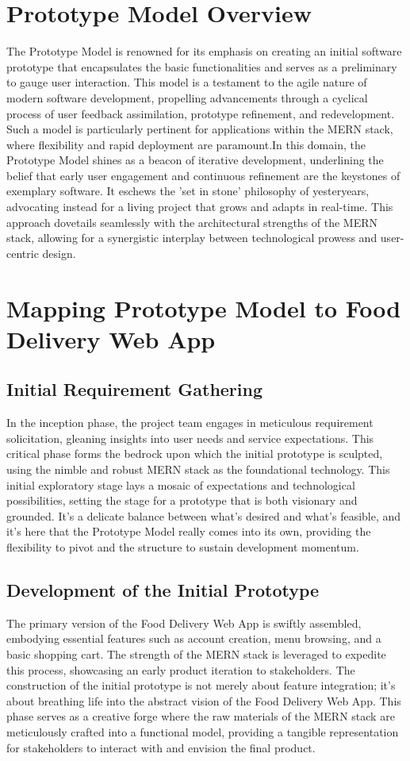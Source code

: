 \documentclass{article}
\begin{document}
\section{Prototype Model Overview}
The Prototype Model is renowned for its emphasis on creating an initial software prototype that encapsulates the basic functionalities and serves as a preliminary to gauge user interaction. This model is a testament to the agile nature of modern software development, propelling advancements through a cyclical process of user feedback assimilation, prototype refinement, and redevelopment. Such a model is particularly pertinent for applications within the MERN stack, where flexibility and rapid deployment are paramount.In this domain, the Prototype Model shines as a beacon of iterative development, underlining the belief that early user engagement and continuous refinement are the keystones of exemplary software. It eschews the 'set in stone' philosophy of yesteryears, advocating instead for a living project that grows and adapts in real-time. This approach dovetails seamlessly with the architectural strengths of the MERN stack, allowing for a synergistic interplay between technological prowess and user-centric design.

\section{Mapping Prototype Model to Food Delivery Web App}
\subsection{Initial Requirement Gathering}
In the inception phase, the project team engages in meticulous requirement solicitation, gleaning insights into user needs and service expectations. This critical phase forms the bedrock upon which the initial prototype is sculpted, using the nimble and robust MERN stack as the foundational technology. This initial exploratory stage lays a mosaic of expectations and technological possibilities, setting the stage for a prototype that is both visionary and grounded. It's a delicate balance between what's desired and what's feasible, and it's here that the Prototype Model really comes into its own, providing the flexibility to pivot and the structure to sustain development momentum.

\subsection{Development of the Initial Prototype}
The primary version of the Food Delivery Web App is swiftly assembled, embodying essential features such as account creation, menu browsing, and a basic shopping cart. The strength of the MERN stack is leveraged to expedite this process, showcasing an early product iteration to stakeholders. The construction of the initial prototype is not merely about feature integration; it's about breathing life into the abstract vision of the Food Delivery Web App. This phase serves as a creative forge where the raw materials of the MERN stack are meticulously crafted into a functional model, providing a tangible representation for stakeholders to interact with and envision the final product.
\end{document}
